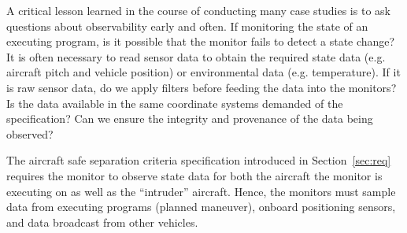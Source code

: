 A critical lesson learned in the course of conducting many case studies
is to ask questions about observability early and often. 
If monitoring the state of an executing program, is it possible that
the monitor fails to detect a state change?  It is often necessary to
read sensor data to obtain the required state data (e.g. aircraft
pitch and vehicle position) or environmental data (e.g. temperature).
If it is raw sensor data, do we apply filters before feeding the data
into the monitors?  Is the data available in the same coordinate
systems demanded of the specification?  Can we ensure the integrity
and provenance of the data being observed? 


  The aircraft safe separation criteria specification introduced in
  Section~\ref{sec:req} requires the monitor to  observe state data for
  both the aircraft the monitor is executing on as well as the
  ``intruder'' aircraft.  Hence, the monitors must sample data from
  executing programs (planned maneuver), onboard positioning sensors,
  and data broadcast from other vehicles.  



